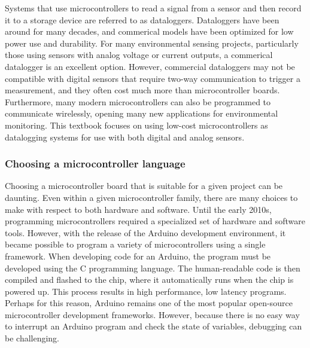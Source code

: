 Systems that use microcontrollers to read a signal from a sensor and then record it to a storage device are referred to as dataloggers.
Dataloggers have been around for many decades, and commerical models have been optimized for low power use and durability.
For many environmental sensing projects, particularly those using sensors with analog voltage or current outputs, a commerical datalogger is an excellent option.
However, commercial dataloggers may not be compatible with digital sensors that require two-way communication to trigger a measurement, and they often cost much more than microcontroller boards.
Furthermore, many modern microcontrollers can also be programmed to communicate wirelessly, opening many new applications for environmental monitoring.
This textbook focuses on using low-cost microcontrollers as datalogging systems for use with both digital and analog sensors.

\subsubsection{Choosing a microcontroller language}
Choosing a microcontroller board that is suitable for a given project can be daunting.
Even within a given microcontroller family, there are many choices to make with respect to both hardware and software.
Until the early 2010s, programming microcontrollers required a specialized set of hardware and software tools.
However, with the release of the Arduino development environment, it became possible to program a variety of microcontrollers using a single framework.
When developing code for an Arduino, the program must be developed using the C programming language.
The human-readable code is then compiled and flashed to the chip, where  it automatically runs when the chip is powered up.
This process results in high performance, low latency programs. 
Perhaps for this reason, Arduino remains one of the most popular open-source microcontroller development frameworks.
However, because there is no easy way to interrupt an Arduino program and check the state of variables, debugging can be challenging.

